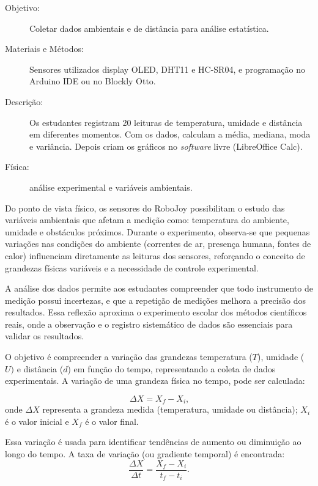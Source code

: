 \documentclass[portuguese]{textolivre}
\begin{document}
\begin{description}
    \item[Objetivo:]  Coletar dados ambientais e de distância para análise estatística.
    \item[Materiais e Métodos:] Sensores utilizados display OLED, DHT11 e HC-SR04, e programação no Arduino IDE ou no Blockly Otto.
    \item[Descrição:] Os estudantes registram 20 leituras de temperatura, umidade e distância em diferentes momentos. Com os dados, calculam a média, mediana, moda e variância. Depois criam os gráficos no \textit{software} livre (LibreOffice Calc).
    \item[Física:] análise experimental e variáveis ambientais.
\end{description}

Do ponto de vista físico, os sensores do RoboJoy possibilitam o estudo das variáveis ambientais que afetam a medição como: temperatura do ambiente, umidade e obstáculos próximos. Durante o experimento, observa-se que pequenas variações nas condições do ambiente (correntes de ar, presença humana, fontes de calor) influenciam diretamente as leituras dos sensores, reforçando o conceito de grandezas físicas variáveis e a necessidade de controle experimental.

A análise dos dados permite aos estudantes compreender que todo instrumento de medição possui incertezas, e que a repetição de medições melhora a precisão dos resultados. Essa reflexão aproxima o experimento escolar dos métodos científicos reais, onde a observação e o registro sistemático de dados são essenciais para validar os resultados.

O objetivo é compreender a variação das grandezas temperatura ($T$), umidade ($U)$ e distância ($d$) em função do tempo, representando a coleta de dados experimentais. A variação de uma grandeza física no tempo, pode ser calculada:

\begin{equation}
	\Delta X = X_f - X_i \text{,}
\end{equation}
onde $\Delta X$ representa a grandeza medida (temperatura, umidade ou distância);
$X_i$ é o valor inicial e
$X_f$ é o valor final.

Essa variação é usada para identificar tendências de aumento ou diminuição ao longo do tempo. A taxa de variação (ou gradiente temporal) é encontrada:
\begin{equation}
	\frac{\Delta X}{\Delta t} = \frac{X_f - X_i}{t_f - t_i} .
\end{equation}
\end{document}
